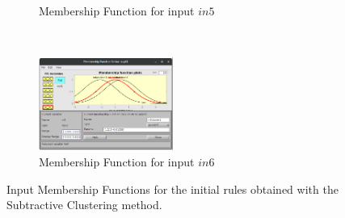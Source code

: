 \documentclass[11pt]{article}
\begin{document}
\begin{figure}[ht]
\begin{subfigure}[t]{0.3\textwidth}
		\caption{Membership Function for input $in5$}
	\end{subfigure}
	~
	\begin{subfigure}[t]{0.3\textwidth}
		\centering
		\includegraphics[height=1.2in]{images/subtractive_in6}
		\caption{Membership Function for input $in6$}
	\end{subfigure}
	\caption{Input Membership Functions for the initial rules obtained with the Subtractive Clustering method.}
\end{figure}

\end{document}
